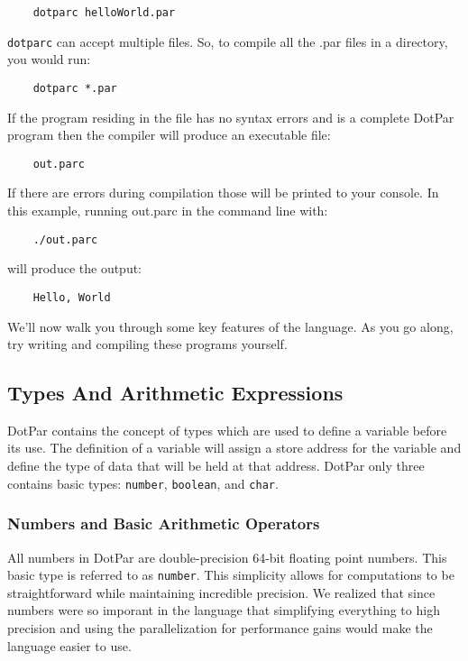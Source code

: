 \begin{verbatim}
    dotparc helloWorld.par
\end{verbatim}

\verb=dotparc= can accept multiple files. So, to compile all the .par files in a directory, you would run: 

\begin{verbatim}
    dotparc *.par
\end{verbatim}

If the program residing in the file has no syntax errors and is a complete DotPar program then the compiler will produce an executable file:

\begin{verbatim}
    out.parc
\end{verbatim}

If there are errors during compilation those will be printed to your console. In this example, running out.parc in the command line with:

\begin{verbatim}
    ./out.parc
\end{verbatim}

will produce the output:

\begin{verbatim}
    Hello, World
\end{verbatim}

We'll now walk you through some key features of the language. As you go along, try writing and compiling these programs yourself.

\subsection{Types And Arithmetic Expressions}

DotPar contains the concept of types which are used to define a variable before its use.  The definition of a variable will assign a store address for the variable and define the type of data that will be held at that address.  DotPar only three contains basic types: \verb=number=, \verb=boolean=, and \verb=char=.

\subsubsection{Numbers and Basic Arithmetic Operators}
All numbers in DotPar are double-precision 64-bit floating point numbers.  This basic type is referred to as \verb=number=.  This simplicity allows for computations to be straightforward while maintaining incredible precision. We realized that since numbers were so imporant in the language that simplifying everything to high precision and using the parallelization for performance gains would make the language easier to use.

